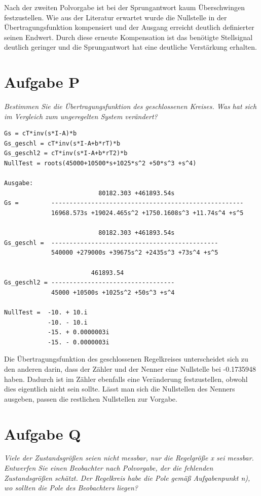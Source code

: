 \noindent Nach der zweiten Polvorgabe ist bei der Sprungantwort kaum Überschwingen festzustellen. Wie aus der Literatur erwartet wurde die Nullstelle in der Übertragungsfunktion kompensiert und der Ausgang erreicht deutlich definierter seinen Endwert. Durch diese erneute Kompensation ist das benötigte Stellsignal deutlich geringer und die Sprungantwort hat eine deutliche Verstärkung erhalten.






\clearpage
\section{Aufgabe P}
\textit{Bestimmen Sie die Übertragungsfunktion des geschlossenen Kreises. Was hat sich im Vergleich zum ungeregelten System verändert?}
 
\begin{lstlisting}[caption = Übertragungsfunktionen der geschlossenen Regelkreise, captionpos = b, label = lst:example]
Gs = cT*inv(s*I-A)*b
Gs_geschl = cT*inv(s*I-A+b*rT)*b
Gs_geschl2 = cT*inv(s*I-A+b*rT2)*b
NullTest = roots(45000+10500*s+1025*s^2 +50*s^3 +s^4)
    
Ausgabe:
                          80182.303 +461893.54s                  
Gs =         -----------------------------------------------------  
             16968.573s +19024.465s^2 +1750.1608s^3 +11.74s^4 +s^5  

                          80182.303 +461893.54s               
Gs_geschl =  ----------------------------------------------  
             540000 +279000s +39675s^2 +2435s^3 +73s^4 +s^5 

                        461893.54               
Gs_geschl2 = ----------------------------------  
             45000 +10500s +1025s^2 +50s^3 +s^4 

NullTest =  -10. + 10.i      
            -10. - 10.i      
            -15. + 0.0000003i
            -15. - 0.0000003i\end{lstlisting}
\noindent Die Übertragungsfunktion des geschlossenen Regelkreises unterscheidet sich zu den anderen darin, dass der Zähler und der Nenner eine Nullstelle bei -0.1735948 haben. Dadurch ist im Zähler ebenfalls eine Veränderung festzustellen, obwohl dies eigentlich nicht sein sollte. Lässt man sich die Nullstellen des Nenners ausgeben, passen die restlichen Nullstellen zur Vorgabe.




\section{Aufgabe Q}
\textit{Viele der Zustandsgrößen seien nicht messbar, nur die Regelgröße x sei messbar. Entwerfen Sie einen Beobachter nach Polvorgabe, der die fehlenden Zustandsgrößen schätzt. Der Regelkreis habe die Pole gemäß Aufgabenpunkt n), wo sollten die Pole des Beobachters liegen?}
 


